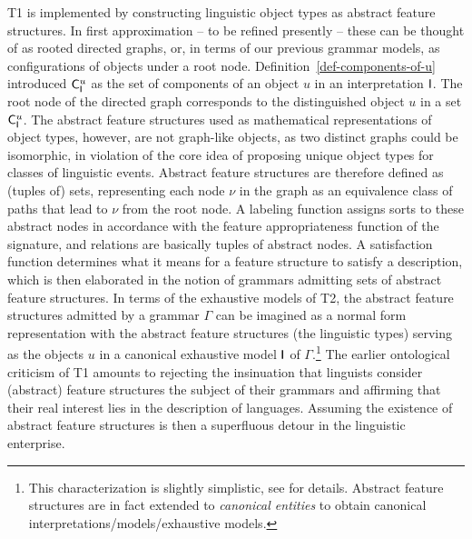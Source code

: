 \documentclass[output=paper
                ,modfonts
                ,nonflat
	        ,collection
	        ,collectionchapter
	        ,collectiontoclongg
 	        ,biblatex
                ,babelshorthands
                ,newtxmath
                ,draftmode
                ,colorlinks, citecolor=brown
]{./langsci/langscibook}
\begin{document}
{{T1 is implemented by constructing linguistic object types as abstract
feature structures. In first approximation -- to be refined presently
-- these can be thought of as rooted directed graphs, or, in terms of
our previous grammar models, as configurations of objects under a root
node. Definition~\ref{def-components-of-u} introduced $\mathsf{C}_{\mathsf{I}}^u$
as the set of components of an object $u$ in an
interpretation $\mathsf{I}$.
The root node of  the directed graph corresponds to the distinguished object $u$ in a set
$\mathsf{C}_{\mathsf{I}}^u$.  The abstract feature structures
used as mathematical representations of object types, however, are not
graph-like objects, as two distinct graphs could be isomorphic, in
violation of the core idea of proposing unique object types for
classes of linguistic events.  Abstract feature structures are
therefore defined as (tuples of) sets, representing each node $\nu$ in
the graph as an equivalence class of paths that lead to $\nu$ from the
root node. A labeling function assigns sorts to these abstract
nodes in accordance with the feature appropriateness function of the
signature, and relations are basically tuples of abstract nodes. A
satisfaction function determines what it means for a feature structure
to satisfy a description, which is then elaborated in the notion of
grammars admitting sets of abstract feature structures. In terms of
the exhaustive models of T2, the abstract feature structures admitted
by a grammar $\Gamma$ can be imagined as a normal form representation with
the abstract feature structures (the linguistic types) serving as
the objects $u$ in a canonical exhaustive model $\mathsf{I}$ of $\Gamma$.\footnote{This characterization is slightly simplistic, see \cite[Appendix A, Definition 80]{Richter2004a-u} for details. Abstract feature structures are in fact extended
  to \emph{canonical entities} to obtain canonical interpretations/models/exhaustive models.} The earlier ontological criticism of T1 amounts
to rejecting the insinuation that linguists consider
(abstract) feature structures the subject of their grammars and
affirming that their real interest lies in the description of languages.
Assuming the existence of abstract feature structures is then a
superfluous detour in the linguistic enterprise.


}}
\end{document}
